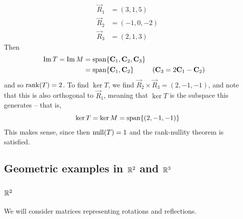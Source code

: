 \documentclass{../../template/note}
\begin{document}
\begin{example}
\begin{itemize}
\begin{align*}
                \vec R_1 &= (3, 1, 5) \\
                \vec R_2 &= (-1, 0, -2) \\
                \vec R_3 &= (2, 1, 3)
            \end{align*}
            Then 
            \begin{align*}
                \Im T = \Im M &= \Span\{\vec C_1, \vec C_2, \vec C_3\} \\
                &= \Span\{\vec C_1, \vec C_2\} && (\vec C_3 = 2 \vec C_1 - \vec C_2)
            \end{align*}
            and so \(\operatorname{rank}(T) = 2\). To find \(\ker T\), we find \(\vec R_2 \times \vec R_3 = (2, -1, -1)\), and note that this is also orthogonal to \(\vec R_1\), meaning that \(\ker T\) is the subspace this generates -- that is,
            \[
                \ker T = \ker M = \operatorname{span} \{(2, -1, -1)\}
            \]
            This makes sense, since then \(\operatorname{null}(T) = 1\) and the rank-nullity theorem is satisfied.
            
        \end{itemize}
        
        
    \end{example}
    
    \subsection{Geometric examples in \(\mathbb R^2\) and \(\mathbb R^3\)}

    \subsubsection{\(\mathbb R^2\)}

    We will consider matrices representing rotations and reflections.
\end{document}
